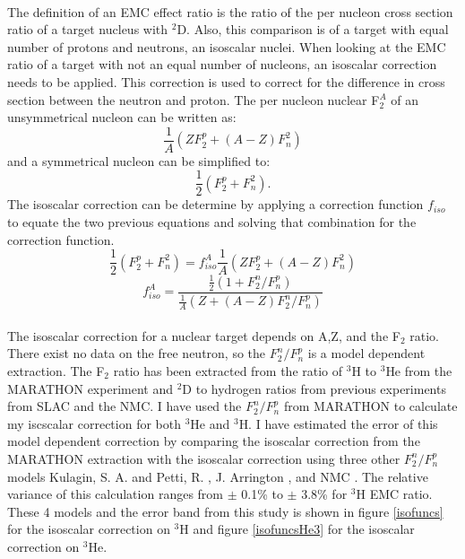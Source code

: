 	\paragraph{}The definition of an EMC effect ratio is the ratio of the per nucleon cross section ratio of a target nucleus with $^2$D. Also,  this comparison is of a target with equal number of protons and neutrons, an isoscalar nuclei. When looking at the EMC ratio of a target with not an equal number of nucleons, an isoscalar correction needs to be applied. This correction is used to correct for the difference in cross section between the neutron and proton. The per nucleon nuclear F$_2^A $ of an unsymmetrical nucleon can be written as:
	\begin{equation}
	\frac{1}{A}\left(ZF^p_2 + \left(A-Z\right)F^2_n\right)\nonumber
	\end{equation}
	and a symmetrical nucleon can be simplified to:
	\begin{equation}
		\frac{1}{2}\left(F^p_2 + F^2_n\right).\nonumber
	\end{equation}	
	The isoscalar correction can be determine by applying a correction function $f_{iso}$ to equate the two previous equations and solving that combination for the correction function.
	\begin{equation}
		\frac{1}{2}\left(F^p_2 + F^2_n\right) =  f^A_{iso}\frac{1}{A}\left(ZF^p_2 + \left(A-Z\right)F^2_n\right)\nonumber
	\end{equation}
	\begin{equation}
	f^A_{iso} = \frac{\frac{1}{2}\left(1+F^n_2/F^p_n\right)}{\frac{1}{A}\left(Z +(A-Z)F^n_2/F^p_n\right)} \label{isoC}
	\end{equation}
	\paragraph{}The isoscalar correction for a nuclear target depends on A,Z, and the F$_2$ ratio. There exist no data on the free neutron, so the $F^n_2/F^p_n$ is a model dependent extraction. The  F$_2$ ratio has been extracted from the ratio of $^3$H to $^3$He from the MARATHON experiment and $^2$D to hydrogen ratios from previous experiments from SLAC and the NMC. I have used the $F^n_2/F^p_n$ from MARATHON to calculate my iscscalar correction for both $^3$He and $^3$H. I have estimated the error of this model dependent correction by comparing the isoscalar correction from the MARATHON extraction with the isoscalar correction using three other $F^n_2/F^p_n$ models Kulagin, S. A. and Petti, R. \cite{kpmodel}, J. Arrington \cite{JA_FR}, and NMC \cite{NMC_ratio}. The relative variance of this calculation ranges from $\pm$ 0.1\% to $\pm$ 3.8\% for $^3$H EMC ratio. These 4 models and the error band from this study is shown in figure \ref{isofuncs} for the isoscalar correction on $^3$H and figure \ref{isofuncsHe3} for the isoscalar correction on $^3$He.

